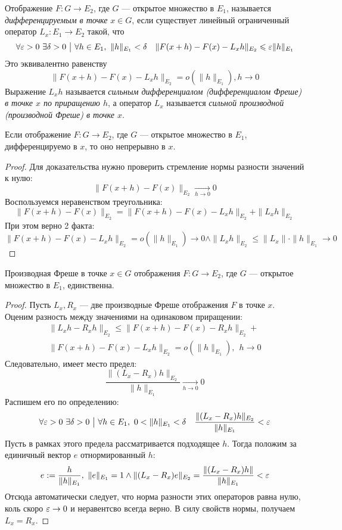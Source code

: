 \begin{definition} 
    Отображение $F \colon G \to E_2$, где $G$ --- открытое множество в $E_1$, называется \textit{дифференцируемым в точке} $x \in G$, если существует линейный ограниченный оператор $L_x \colon E_1 \to E_2$ такой, что 
    \[
        \forall \varepsilon > 0\ \exists \delta > 0 \ \big|\  \forall h \in E_1,\ \|h\|_{E_1} < \delta \quad \|F(x + h) - F(x) - L_xh\|_{E_2} \leqslant \varepsilon \|h\|_{E_1}
    \]
    Это эквивалентно равенству
    \[
        \|F(x+h)-F(x)-L_x h\|_{E_2}=o(\|h\|_{E_1}), h \to 0
    \]
    Выражение $L_xh$ называется \textit{сильным дифференциалом (дифференциалом Фреше) в точке $x$ по приращению $h$}, а оператор $L_x$ называется \textit{сильной производной (производной Фреше) в точке $x$}.
\end{definition}

\begin{proposition}
    Если отображение $F \colon G \to E_2$, где $G$ --- открытое множество в $E_1$, дифференцируемо в $x$, то оно непрерывно в $x$.
\end{proposition}
\begin{proof}
 	Для доказательства нужно проверить стремление нормы разности значений к нулю:
    \[
        \|F(x + h) - F(x)\|_{E_2} \xrightarrow[h \to 0]{} 0
    \]
    Воспользуемся неравенством треугольника:
    \[  
        \|F(x + h) - F(x)\|_{E_2} = \|F(x + h) - F(x) - L_xh\|_{E_2} + \|L_xh\|_{E_2}
    \]
    При этом верно 2 факта:
    \[
        \|F(x + h) - F(x) - L_xh\|_{E_2} = o(\|h\|_{E_1}) \to 0 \wedge \|L_xh\|_{E_2} \leq \|L_x\| \cdot \|h\|_{E_1} \to 0
    \]
\end{proof}

\begin{proposition}
    Производная Фреше в точке $x \in G$ отображения $F \colon G \to E_2$, где $G$ --- открытое множество в $E_1$, единственна.
\end{proposition}

\begin{proof}
    Пусть $L_x, R_x$ --- две производные Фреше отображения $F$ в точке $x$. Оценим разность между значениями на одинаковом приращении:
    \begin{multline*}
        \|L_xh - R_xh\|_{E_2} \leq \|F(x + h) - F(x) - R_xh\|_{E_2} +
        \\
        \|F(x + h) - F(x) - L_xh\|_{E_2} = o(\|h\|_{E_1}),\ \ h \to 0
    \end{multline*}
    Следовательно, имеет место предел:
    \[
        \frac{\|(L_x - R_x)h\|_{E_2}}{\|h\|_{E_1}} \xrightarrow[h \to 0]{} 0
    \]
    Распишем его по определению:
    \[
        \forall \varepsilon > 0\ \exists \delta > 0 \ \big|\  \forall h \in E_1,\ 0 < \|h\|_{E_1} < \delta \quad \frac{\|(L_x - R_x)h\|_{E_2}}{\|h\|_{E_1}} < \varepsilon
    \]
    Пусть в рамках этого предела рассматривается подходящее $h$. Тогда положим за единичный вектор $e$ отнормированный $h$:
    \[
    	e := \frac{h}{\|h\|_{E_1}},\ \|e\|_{E_1} = 1 \wedge \|(L_x - R_x)e\|_{E_2} = \frac{\|(L_x - R_x)h\|}{\|h\|_{E_1}} < \varepsilon
    \]
    Отсюда автоматически следует, что норма разности этих операторов равна нулю, коль скоро $\varepsilon \to 0$ и неравентсво всегда верно. В силу свойств нормы, получаем $L_x = R_x$.
\end{proof}

